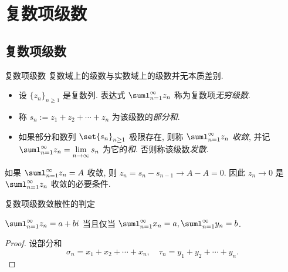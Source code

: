 \section{复数项级数}

\subsection{复数项级数}
\begin{frame}{复数项级数}
	\onslide<+->
	复数域上的级数与实数域上的级数并无本质差别.

	\onslide<+->
	\begin{definition}
		\begin{itemize}
			\item 设 $\{z_n\}_{n\ge1}$ 是复数列. 表达式 $\suml_{n=1}^\infty z_n$ 称为复数项\emph{无穷级数}.
			\item 称 $s_n:=z_1+z_2+\cdots+z_n$ 为该级数的\emph{部分和}.
			\item 如果部分和数列 $\set{s_n}_{n\ge 1}$ 极限存在, 则称 $\suml_{n=1}^\infty z_n$ \emph{收敛}, 并记 $\suml_{n=1}^\infty z_n=\lim\limits_{n\to\infty}s_n$ 为它的\emph{和}. 否则称该级数\emph{发散}.
		\end{itemize}
	\end{definition}

	\onslide<+->
	如果 $\suml_{n=1}^\infty z_n=A$ 收敛, 则 $z_n=s_n-s_{n-1}\to A-A=0$.
	\onslide<+->
	因此 \alert{$z_n\to0$ 是 $\suml_{n=1}^\infty z_n$ 收敛的必要条件}.
\end{frame}


\begin{frame}{复数项级数敛散性的判定}
	\onslide<+->
	\begin{theorem}
		$\suml_{n=1}^\infty z_n=a+bi$ 当且仅当 $\suml_{n=1}^\infty x_n=a,\suml_{n=1}^\infty y_n=b$.
	\end{theorem}

	\onslide<+->
	\begin{proof}
		设部分和
		\[\sigma_n=x_1+x_2+\cdots+x_n,\quad
			\tau_n=y_1+y_2+\cdots+y_n.\]
		\onslide<+->{于是命题得证.\qedhere}
	\end{proof}
\end{frame}



